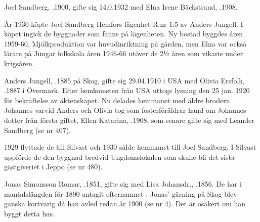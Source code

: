 
Joel Sandberg, .1900, gifte sig 14.0.1932 med Elna Irene Bäckstrand, .1908.

År 1930 köpte Joel Sandberg Hemfors lägenhet R:nr 1:5 av Anders Jungell. I köpet ingick de byggnader som fanns på lägenheten. Ny bostad byggdes åren 1959-60. Mjölkproduktion var huvudinriktning på gården, men Elna var också lärare på Jungar folkskola åren 1946-66 utöver de 2½ åren som vikarie under krigsåren.
\begin{jhchildren}
  \item {}
  \item {}
  \item {}
  \item {}
\end{jhchildren}



Anders Jungell, .1885 på Skog, gifte sig  29.04.1910 i USA med Olivia Ersfolk, .1887 i Övermark. Efter hemkomsten från USA uttogs lysning den 25 jan. 1920 för bekräftelse av äktenskapet. Nu delades hemmanet med äldre brodern Johannes varvid Anders och Olivia tog som fosterföräldrar hand om Johannes dotter från första giftet, Ellen Katarina, .1908, som senare gifte sig med Leander Sandberg (se nr 407).

1929 flyttade de till Silvast och 1930 sålde hemmanet till Joel Sandberg. I Silvast uppförde de den byggnad bredvid Ungdomslokalen som skulle bli det sista gästgiveriet i Jeppo (se nr 480).



Jonas Simonsson Romar, .1851, gifte sig med Lisa Johansdr., .1856. De har i mantalslängden för 1890 antagit efternamnet . Jonas' gärning på Skog blev ganska kortvarig  då han avled redan år 1900 (se nr 4). Det är osäkert om han byggt detta hus.
